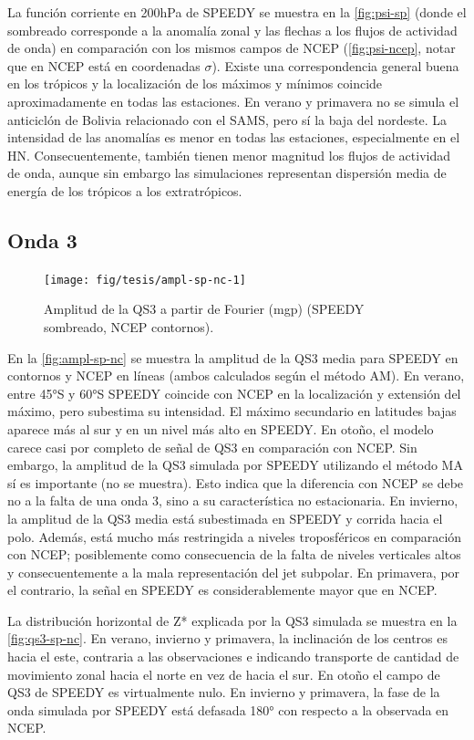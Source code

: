 \documentclass[spanish,a4paper,12pt,oneside]{book}
\begin{document}
La función corriente en 200hPa de SPEEDY se muestra en la
\autoref{fig:psi-sp} (donde el sombreado corresponde a la anomalía zonal
y las flechas a los flujos de actividad de onda) en comparación con los
mismos campos de NCEP (\autoref{fig:psi-ncep}, notar que en NCEP está en
coordenadas \(\sigma\)). Existe una correspondencia general buena en los
trópicos y la localización de los máximos y mínimos coincide
aproximadamente en todas las estaciones. En verano y primavera no se
simula el anticiclón de Bolivia relacionado con el SAMS, pero sí la baja
del nordeste. La intensidad de las anomalías es menor en todas las
estaciones, especialmente en el HN. Consecuentemente, también tienen
menor magnitud los flujos de actividad de onda, aunque sin embargo las
simulaciones representan dispersión media de energía de los trópicos a
los extratrópicos.

\subsection{Onda 3}\label{onda-3-1}

\begin{figure}
\texttt{[image: fig/tesis/ampl-sp-nc-1]} \caption{Amplitud de la QS3 a partir de Fourier (mgp) (SPEEDY sombreado, NCEP contornos).}\label{fig:ampl-sp-nc}
\end{figure}

En la \autoref{fig:ampl-sp-nc} se muestra la amplitud de la QS3 media
para SPEEDY en contornos y NCEP en líneas (ambos calculados según el
método AM). En verano, entre 45°S y 60°S SPEEDY coincide con NCEP en la
localización y extensión del máximo, pero subestima su intensidad. El
máximo secundario en latitudes bajas aparece más al sur y en un nivel
más alto en SPEEDY. En otoño, el modelo carece casi por completo de
señal de QS3 en comparación con NCEP. Sin embargo, la amplitud de la QS3
simulada por SPEEDY utilizando el método MA sí es importante (no se
muestra). Esto indica que la diferencia con NCEP se debe no a la falta
de una onda 3, sino a su característica no estacionaria. En invierno, la
amplitud de la QS3 media está subestimada en SPEEDY y corrida hacia el
polo. Además, está mucho más restringida a niveles troposféricos en
comparación con NCEP; posiblemente como consecuencia de la falta de
niveles verticales altos y consecuentemente a la mala representación del
jet subpolar. En primavera, por el contrario, la señal en SPEEDY es
considerablemente mayor que en NCEP.

La distribución horizontal de Z* explicada por la QS3 simulada se
muestra en la \autoref{fig:qs3-sp-nc}. En verano, invierno y primavera,
la inclinación de los centros es hacia el este, contraria a las
observaciones e indicando transporte de cantidad de movimiento zonal
hacia el norte en vez de hacia el sur. En otoño el campo de QS3 de
SPEEDY es virtualmente nulo. En invierno y primavera, la fase de la onda
simulada por SPEEDY está defasada 180° con respecto a la observada en
NCEP.
\end{document}
